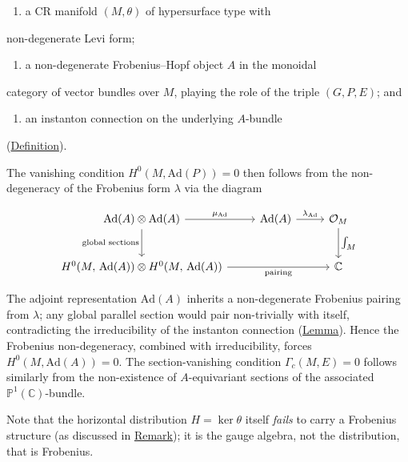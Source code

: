 \begin{remark}
\begin{enumerate}
  \item a CR manifold $(M, \theta)$ of hypersurface type with
\end{enumerate}
   non-degenerate Levi form;
\begin{enumerate}
  \item a non-degenerate Frobenius--Hopf object $A$ in the monoidal
\end{enumerate}
   category of vector bundles over $M$, playing the role of the
   triple $(G, P, E)$; and
\begin{enumerate}
  \item an instanton connection on the underlying $A$-bundle
\end{enumerate}
   (\hyperref[def:instanton]{Definition}).

The vanishing condition $H^0(M, \mathrm{Ad}(P)) = 0$ then follows from
the non-degeneracy of the Frobenius form $\lambda$ via the diagram

\begin{equation}\label{eq:frobenius-vanishing}
\begin{tikzcd}[row sep=2.5em, column sep=2.5em]
  \mathrm{Ad}(A) \otimes \mathrm{Ad}(A)
    \ar[r, "\mu_{\mathrm{Ad}}"]
    \ar[d, "\text{global sections}"']
  & \mathrm{Ad}(A)
    \ar[r, "\lambda_{\mathrm{Ad}}"]
  & \mathcal{O}_M
    \ar[d, "\textstyle\int_M"]
  \\
  H^0(M,\,\mathrm{Ad}(A)) \otimes H^0(M,\,\mathrm{Ad}(A))
    \ar[rr, "\text{pairing}"']
  & & \mathbb{C}
\end{tikzcd}
\end{equation}

The adjoint representation $\mathrm{Ad}(A)$ inherits a non-degenerate
Frobenius pairing from $\lambda$; any global parallel section would
pair non-trivially with itself, contradicting the irreducibility of
the instanton connection
(\hyperref[lem:irreducible-connection]{Lemma}). Hence the Frobenius
non-degeneracy, combined with irreducibility, forces
$H^0(M, \mathrm{Ad}(A)) = 0$. The section-vanishing condition
$\Gamma_c(M, E) = 0$ follows similarly from the non-existence of
$A$-equivariant sections of the associated $\mathbb{P}^1(\mathbb{C})$-bundle.

Note that the horizontal distribution $H = \ker\theta$ itself
\emph{fails} to carry a Frobenius structure (as discussed in
\hyperref[rem:q-torsion-existence]{Remark}); it is the gauge algebra, not the
distribution, that is Frobenius.
\end{remark}

